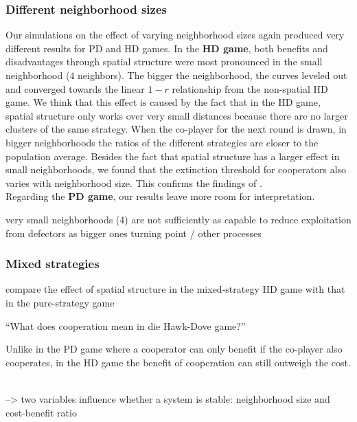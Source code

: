 \subsubsection*{Different neighborhood sizes}

Our simulations on the effect of varying neighborhood sizes again produced very different results for PD and HD games. 
In the \textbf{HD game}, both benefits and disadvantages through spatial structure were most pronounced in the small neighborhood ($4$ neighbors). The bigger the neighborhood, the curves leveled out and converged towards the linear $1-r$ relationship from the non-spatial HD game. We think that this effect is caused by the fact that in the HD game, spatial structure only works over very small distances because there are no larger clusters of the same strategy. When the co-player for the next round is drawn, in bigger neighborhoods the ratios of the different strategies are closer to the population average.
Besides the fact that spatial structure has a larger effect in small neighborhoods, we found that the extinction threshold for cooperators also varies with neighborhood size. This confirms the findings of \cite{HauertandDoebeli2004}.\\
Regarding the \textbf{PD game}, our results leave more room for interpretation.


\cite{ohtsuki2006simple}



\citep{wang2012spatial}


very small neighborhoods (4) are not sufficiently as capable to reduce exploitation from defectors as bigger ones
turning point / other processes

\subsubsection*{Mixed strategies}

compare the effect of spatial structure in the mixed-strategy HD game with that in the pure-strategy game






``What does cooperation mean in die Hawk-Dove game?''

Unlike in the PD game where a cooperator can only benefit if the co-player also cooperates, in the HD game the benefit of cooperation can still outweigh the cost.

\\
--> two variables influence whether a system is stable: neighborhood size and cost-benefit ratio


